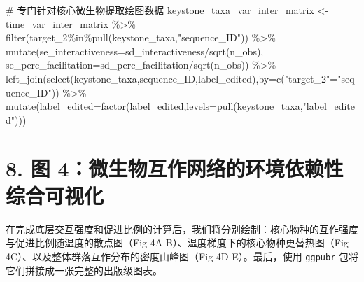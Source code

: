 \documentclass[
  letterpaper,
  DIV=11,
  numbers=noendperiod]{scrreprt}
\newenvironment{Shaded}{\begin{snugshade}}{\end{snugshade}}
\newcommand{\AttributeTok}[1]{\textcolor[rgb]{0.40,0.45,0.13}{#1}}
\newcommand{\CommentTok}[1]{\textcolor[rgb]{0.37,0.37,0.37}{#1}}
\newcommand{\FunctionTok}[1]{\textcolor[rgb]{0.28,0.35,0.67}{#1}}
\newcommand{\NormalTok}[1]{\textcolor[rgb]{0.00,0.23,0.31}{#1}}
\newcommand{\OtherTok}[1]{\textcolor[rgb]{0.00,0.23,0.31}{#1}}
\newcommand{\SpecialCharTok}[1]{\textcolor[rgb]{0.37,0.37,0.37}{#1}}
\newcommand{\StringTok}[1]{\textcolor[rgb]{0.13,0.47,0.30}{#1}}
\begin{document}
\begin{Shaded}
\begin{Highlighting}[]
\CommentTok{\# 专门针对核心微生物提取绘图数据}
\NormalTok{keystone\_taxa\_var\_inter\_matrix }\OtherTok{\textless{}{-}}\NormalTok{ time\_var\_inter\_matrix }\SpecialCharTok{\%\textgreater{}\%}
  \FunctionTok{filter}\NormalTok{(target\_2}\SpecialCharTok{\%in\%}\FunctionTok{pull}\NormalTok{(keystone\_taxa,}\StringTok{"sequence\_ID"}\NormalTok{)) }\SpecialCharTok{\%\textgreater{}\%}
  \FunctionTok{mutate}\NormalTok{(}\AttributeTok{se\_interactiveness=}\NormalTok{sd\_interactiveness}\SpecialCharTok{/}\FunctionTok{sqrt}\NormalTok{(n\_obs), }
         \AttributeTok{se\_perc\_facilitation=}\NormalTok{sd\_perc\_facilitation}\SpecialCharTok{/}\FunctionTok{sqrt}\NormalTok{(n\_obs)) }\SpecialCharTok{\%\textgreater{}\%}
  \FunctionTok{left\_join}\NormalTok{(}\FunctionTok{select}\NormalTok{(keystone\_taxa,sequence\_ID,label\_edited),}\AttributeTok{by=}\FunctionTok{c}\NormalTok{(}\StringTok{"target\_2"}\OtherTok{=}\StringTok{"sequence\_ID"}\NormalTok{)) }\SpecialCharTok{\%\textgreater{}\%}
  \FunctionTok{mutate}\NormalTok{(}\AttributeTok{label\_edited=}\FunctionTok{factor}\NormalTok{(label\_edited,}\AttributeTok{levels=}\FunctionTok{pull}\NormalTok{(keystone\_taxa,}\StringTok{"label\_edited"}\NormalTok{)))}
\end{Highlighting}
\end{Shaded}

\section{8. 图
4：微生物互作网络的环境依赖性综合可视化}\label{ux56fe-4ux5faeux751fux7269ux4e92ux4f5cux7f51ux7edcux7684ux73afux5883ux4f9dux8d56ux6027ux7efcux5408ux53efux89c6ux5316}

在完成底层交互强度和促进比例的计算后，我们将分别绘制：核心物种的互作强度与促进比例随温度的散点图（Fig
4A-B）、温度梯度下的核心物种更替热图（Fig
4C）、以及整体群落互作分布的密度山峰图（Fig 4D-E）。最后，使用
\texttt{ggpubr} 包将它们拼接成一张完整的出版级图表。
\end{document}
